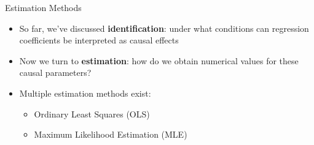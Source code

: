 \documentclass[dvipsnames,hyperref={pdfpagelabels=false}]{beamer}
\begin{document}





\date
{}


\begin{frame}{}
	\titlepage
\end{frame}



\begin{frame}{Estimation Methods}
	\begin{itemize}
		\item So far, we've discussed \textbf{identification}: under what conditions can regression coefficients be interpreted as causal effects
		\vspace{0.2cm}
		
		\item Now we turn to \textbf{estimation}: how do we obtain numerical values for these causal parameters?
		\vspace{0.2cm}
		
		\item Multiple estimation methods exist:
        		\vspace{0.2cm}
		\begin{itemize}
			\item Ordinary Least Squares (OLS)
            		\vspace{0.2cm}
			\item Maximum Likelihood Estimation (MLE)
		\end{itemize}
	\end{itemize}
\end{frame}
\end{document}
